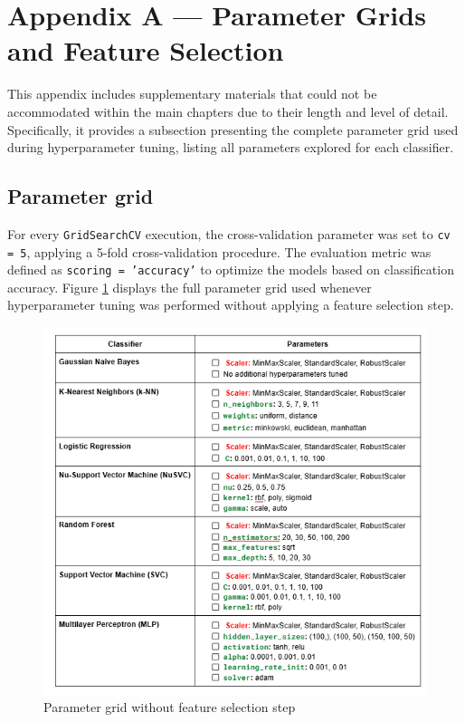 \documentclass{article}
\begin{document}
\clearpage

\appendix
\section{Appendix A — Parameter Grids and Feature Selection}
\label{subsec:param}

This appendix includes supplementary materials that could not be accommodated within the main chapters due to their length and level of detail. 
Specifically, it provides a subsection presenting the complete parameter grid used during hyperparameter tuning, listing all parameters explored for each classifier. 

\subsection{Parameter grid}
For every \texttt{GridSearchCV} execution, the cross-validation parameter was set to \texttt{cv = 5}, applying a 5-fold cross-validation procedure.
The evaluation metric was defined as \texttt{scoring = 'accuracy'} to optimize the models based on classification accuracy.
Figure \ref{fig:pg_nofs} displays the full parameter grid used whenever hyperparameter tuning was performed without applying a feature selection step.

\begin{figure}[ht]
    \centering
    \includegraphics[width = 0.8
    \textwidth]{Images/Results/param_grid_nofs.png}
    \caption{Parameter grid without feature selection step}
    \label{fig:pg_nofs}
\end{figure}
\end{document}
